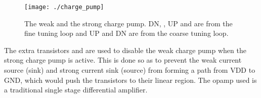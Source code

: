 \documentclass[journal,twoside,letterpaper]{IEEEtran}
\begin{document}
\begin{figure}[h]
\centering
\texttt{[image: ./charge\_pump]}
\caption{The weak and the strong charge pump. DN, ,
UP and  are from the fine tuning loop and UP
and DN are from the coarse tuning loop.}
\label{fig:charge_pump}
\end{figure}


The extra transistors  and  are used to disable the 
weak charge pump when the strong charge pump is active. This is 
done so as to prevent the weak current source (sink)  and 
strong current sink (source) from forming a path
from VDD to GND, which would push the transistors to their linear region. 
The opamp used is a traditional single stage differential amplifier.
\end{document}
